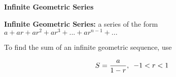 \begin{center}
\textbf{Infinite Geometric Series}
\end{center}

\vspace*{1ex}

\textbf{Infinite Geometric Series:} a series of the form $a+ar+ar^{2}+ar^{3}+... +ar^{n-1}+... $

\vspce


To find the sum of an infinite geometric sequence, use

$$\displaystyle S = \frac{a}{1-r}, \hspace{0.5em} -1<r<1$$


